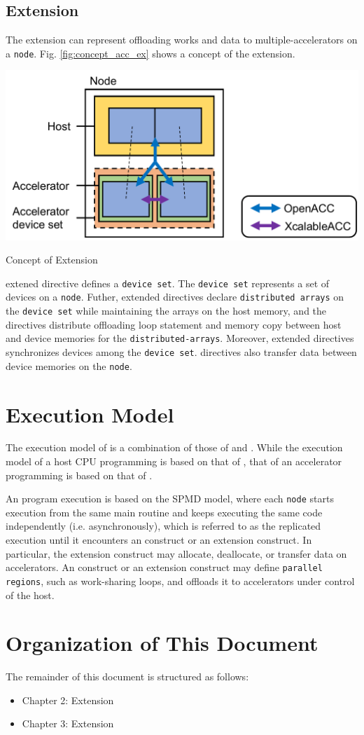 \subsection{{\OACC} Extension}
The {\OACC} extension can represent offloading works and data to multiple-accelerators on a {\tt node}.
Fig. \ref{fig:concept_acc_ex} shows a concept of the {\OACC} extension.

\begin{myfigure}
\includegraphics[scale=0.5,clip]{figs/concept_acc_ext.pdf}
  \caption{Concept of {\OACC} Extension}\label{fig:concept_acc_ex}
\end{myfigure}

{\OACC} extened directive defines a {\tt device set}.
The {\tt device set} represents a set of devices on a {\tt node}.
Futher, {\OACC} extended directives declare {\tt distributed arrays} on the {\tt device set} while maintaining the arrays on the host memory, and the directives distribute offloading loop statement and memory copy between host and device memories for the {\tt distributed-arrays}.
Moreover, {\OACC} extended directives synchronizes devices among the {\tt device set}.
{\XACC} directives also transfer data between device memories on the {\tt node}.

\section{Execution Model}
The execution model of {\XACC} is a combination of those of {\XMP} and {\OACC}.
While the execution model of a host CPU programming is based on that of {\XMP},
that of an accelerator programming is based on that of {\OACC}.

An {\XACC} program execution is based on the SPMD model, 
where each {\tt node} starts execution from the same main routine and keeps executing the same code independently (i.e. asynchronously), 
which is referred to as the replicated execution
until it encounters an {\XMP} construct or an {\XMP} extension construct.
In particular,
the {\XMP} extension construct may allocate, deallocate, or transfer data on accelerators.
An {\OACC} construct or an {\OACC} extension construct may define {\tt parallel regions}, such as work-sharing loops, 
and offloads it to accelerators under control of the host.

\section{Organization of This Document}
The remainder of this document is structured as follows:

\begin{itemize}
 \item Chapter 2: {\XMP} Extension
 \item Chapter 3: {\OACC} Extension
\end{itemize}
